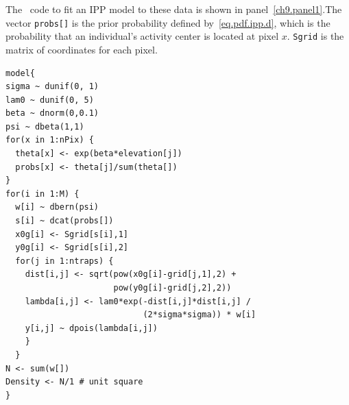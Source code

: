The \bugs~code to fit an IPP model to these data is shown in
panel~\ref{ch9.panel1}.The vector \verb+probs[]+ is the prior
probability defined
by~\ref{eq.pdf.ipp.d}, which is the probability that an individual's
activity center is located at pixel $x$. \verb+Sgrid+ is the
matrix of coordinates for each pixel.

\begin{small}
\begin{verbatim}
model{
sigma ~ dunif(0, 1)
lam0 ~ dunif(0, 5)
beta ~ dnorm(0,0.1)
psi ~ dbeta(1,1)
for(x in 1:nPix) {
  theta[x] <- exp(beta*elevation[j])
  probs[x] <- theta[j]/sum(theta[])
}
for(i in 1:M) {
  w[i] ~ dbern(psi)
  s[i] ~ dcat(probs[])
  x0g[i] <- Sgrid[s[i],1]
  y0g[i] <- Sgrid[s[i],2]
  for(j in 1:ntraps) {
    dist[i,j] <- sqrt(pow(x0g[i]-grid[j,1],2) +
                      pow(y0g[i]-grid[j,2],2))
    lambda[i,j] <- lam0*exp(-dist[i,j]*dist[i,j] /
                            (2*sigma*sigma)) * w[i]
    y[i,j] ~ dpois(lambda[i,j])
    }
  }
N <- sum(w[])
Density <- N/1 # unit square
}
\end{verbatim}
\end{small}

